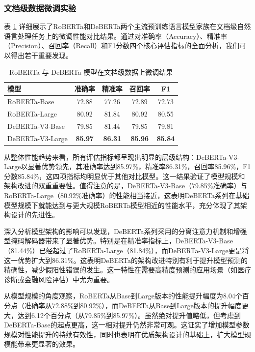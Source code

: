 \subsubsection{文档级数据微调实验}

表 \ref{tab:document} 详细展示了RoBERTa和DeBERTa两个主流预训练语言模型家族在文档级自然语言处理任务上的微调性能对比结果。通过对准确率（Accuracy）、精准率（Precision）、召回率（Recall）和F1分数四个核心评估指标的全面分析，我们可以得出若干重要发现。

\begin{table}[htbp]
\caption{RoBERTa 与 DeBERTa 模型在文档级数据上微调结果}
\centering
\begin{tabular}{l|cccc}
\toprule
\textbf{模型}& \textbf{准确率}   & \textbf{精准率}    & \textbf{召回率}    & \textbf{F1}   \\ \midrule
RoBERTa-Base  & 72.88          & 77.26          & 72.89          & 72.73          \\
RoBERTa-Large & 80.92          & 81.84          & 80.92          & 80.55          \\
DeBERTa-V3-Base  & 79.85          & 81.44          & 79.85          & 79.81          \\
DeBERTa-V3-Large & \textbf{85.97} & \textbf{86.31} & \textbf{85.96} & \textbf{85.84} \\ \bottomrule
\end{tabular}
\label{tab:document}
\end{table}

从整体性能趋势来看，所有评估指标都呈现出明显的层级结构：DeBERTa-V3-Large以显著优势领先，其准确率达到85.97\%，精准率86.31\%，召回率85.96\%，F1分数85.84\%，这四项指标均明显优于其他对比模型。这一结果验证了模型规模和架构改进的双重重要性。值得注意的是，DeBERTa-V3-Base（79.85\%准确率）与RoBERTa-Large（80.92\%准确率）的性能相当接近，这表明DeBERTa系列在基础模型规模下就能达到与更大规模RoBERTa模型相近的性能水平，充分体现了其架构设计的先进性。

深入分析模型架构的影响可以发现，DeBERTa系列采用的分离注意力机制和增强型掩码解码器带来了显著优势。特别是在精准率指标上，DeBERTa-V3-Base（81.44\%）已经超过了RoBERTa-Large（81.84\%），而DeBERTa-V3-Large更是将这一优势扩大到86.31\%。这表明DeBERTa的架构改进特别有利于提升模型预测的精确性，减少假阳性错误的发生。这一特性在需要高精度预测的应用场景（如医疗诊断或金融风险评估）中尤为重要。

从模型规模的角度观察，RoBERTa从Base到Large版本的性能提升幅度为8.04个百分点（准确率从72.88\%到80.92\%），而DeBERTa从Base到Large版本的提升幅度更大，达到6.12个百分点（从79.85\%到85.97\%）。虽然绝对提升值略低，但考虑到DeBERTa-Base的起点更高，这一相对提升仍然非常可观。这证实了增加模型参数规模对性能提升的持续有效性，同时也表明在优质架构设计的基础上，扩大模型规模能带来更显著的效果。

